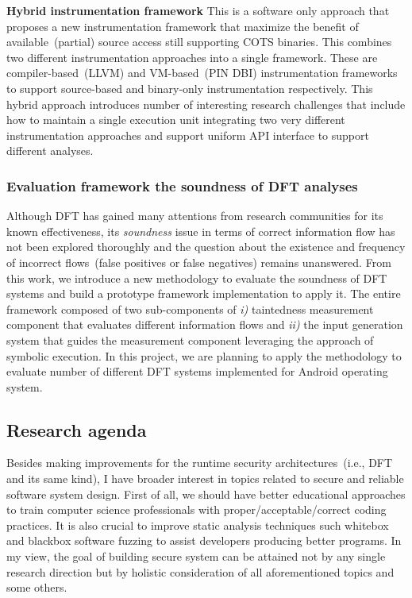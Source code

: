 \documentclass[letterpaper, 10pt]{article}
\begin{document}
\begin{small}
{\bf Hybrid instrumentation framework} This is a software only approach that
proposes a new instrumentation framework that maximize the benefit of
available~(partial) source access still supporting COTS binaries.
%
This combines two different instrumentation approaches into a single framework.
These are compiler-based~(LLVM) and VM-based~(PIN DBI) instrumentation
frameworks to support source-based and binary-only instrumentation respectively.
%
This hybrid approach introduces number of interesting research challenges that
include how to maintain a single execution unit integrating two very different
instrumentation approaches and support uniform API interface to support
different analyses.
%

\subsubsection*{Evaluation framework the soundness of DFT analyses}
%
Although DFT has gained many attentions from research communities for its known
effectiveness, its {\it soundness} issue in terms of correct information flow
has not been explored thoroughly and the question about the existence and
frequency of incorrect flows~(false positives or false negatives) remains
unanswered. From this work, we introduce a new methodology to evaluate the
soundness of DFT systems and build a prototype framework implementation to
apply it.
%
The entire framework composed of two sub-components of {\it i)} taintedness
measurement component that evaluates different information flows and {\it ii)}
the input generation system that guides the measurement component leveraging
the approach of symbolic execution.
%
In this project, we are planning to apply the methodology to evaluate number of
different DFT systems implemented for Android operating system.

%
%
\subsection*{Research agenda}
%
Besides making improvements for the runtime security architectures~(i.e., DFT
and its same kind), I have broader interest in topics related to secure and
reliable software system design.
%
First of all, we should have better educational approaches to train computer
science professionals with proper/acceptable/correct coding practices.
%
It is also crucial to improve static analysis techniques such whitebox and
blackbox software fuzzing to assist developers producing better programs. 
%
In my view, the goal of building secure system can be attained not by any
single research direction but by holistic consideration of all aforementioned
topics and some others.


\end{small}
\end{document}
